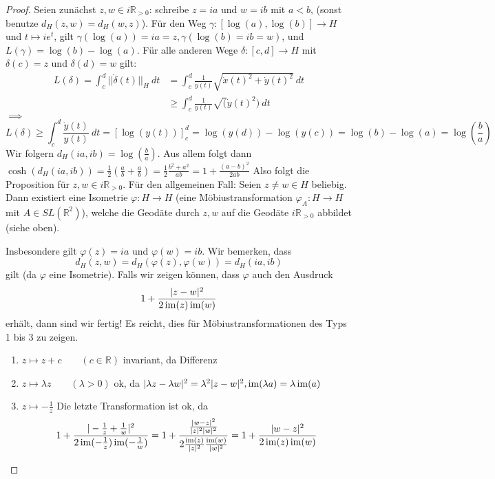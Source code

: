 \documentclass[../main.tex]{subfiles}
\begin{document}
\begin{proof}
    Seien zunächst $z,w \in i\mathbb{R}_{>0}$: schreibe $z=ia$ und $w=ib$ mit $a<b$, (sonst benutze $d_H(z,w)=d_H(w,z)$).
    Für den Weg $\gamma : [\log (a), \log(b)]\to H$ und $ t \mapsto i e^t$, gilt $\gamma(\log(a))=ia=z, \gamma(\log(b)=ib=w)$,
    und $L(\gamma) = \log (b)-\log(a)$. Für alle anderen Wege $\delta : [c,d]\to H$ mit
    $\delta(c)=z$ und $\delta(d)=w$ gilt:
    \begin{align*}
        L(\delta)= \int _c ^d || \dot{\delta}(t)||_H \ dt & = \int_c ^d \frac{1}{y(t)}\sqrt{\dot{x}(t)^2+\dot{y}(t)^2}\ dt \\
        &\ge \int_c ^d \frac{1}{y(t)}\sqrt(\dot{y}(t)^2)\ dt
    \end{align*}$\implies$
    $$L(\delta) \ge \int_c^d \frac{\dot y (t)}{y(t)} \ dt = \left[ \log (y(t)) \right]_c^d = \log(y(d))-\log(y(c))=\log(b)-\log(a)=\log(\frac{b}{a})$$
    Wir folgern $d_H (ia,ib)= \log(\frac{b}{a})$. Aus allem folgt dann $\cosh(d_H(ia,ib))=\frac{1}{2}(\frac{a}{b}+\frac{a}{b})=\frac{1}{2}\frac{b^2+a^2}{ab}=1+ \frac{(a-b)^2}{2ab}$
    Also folgt die Proposition für $z,w \in i\mathbb{R}_{>0}$. Für den allgemeinen Fall:
    Seien $z \not = w\in H$ beliebig. Dann existiert eine Isometrie $\varphi : H \to H$ (eine Möbiustransformation $\varphi _A : H \to H$ mit $A \in SL(\mathbb{R}^2)$),
    welche die Geodäte durch $z,w$ auf die Geodäte $i \mathbb{R}_{>0}$ abbildet (siehe oben).

    Insbesondere gilt $\varphi (z)=ia$ und $\varphi(w)=ib$. Wir bemerken, dass $$d_H(z,w)=d_H(\varphi(z),\varphi(w))=d_H(ia,ib)$$ gilt (da $\varphi$ eine Isometrie).
    Falls wir zeigen können, dass $\varphi$ auch den Ausdruck
    $$1+\frac{|z-w|^2}{2\operatorname{im}(z)\operatorname{im}(w)}$$ erhält, dann sind wir fertig! Es reicht, dies für Möbiustransformationen des Typs 1 bis 3 zu zeigen.
    \begin{enumerate}
        \item $z \mapsto z+ c \qquad(c\in \mathbb{R})$ invariant, da Differenz
        \item $z \mapsto \lambda z \qquad (\lambda > 0)$ ok, da $|\lambda z - \lambda w |^2 = \lambda^2 |z-w|^2, \operatorname{im}(\lambda a)=\lambda \operatorname{im}(a)$ 
        \item $z \mapsto -\frac{1}{z}$
        Die letzte Transformation ist ok, da
        $$1 + \frac{|-\frac{1}{z}+\frac{1}{w}|^2}{2 \operatorname{im}(-\frac{1}{z})\operatorname{im}(-\frac{1}{w})}=1 + \frac{\frac{|w-z|^2}{|z|^2|w|^2}}{2\frac{\operatorname{im}(z)}{|z|^2}\frac{\operatorname{im}(w)}{|w|^2}}=1+\frac{|w-z|^2}{2\operatorname{im}(z)\operatorname{im}(w)}$$
    \end{enumerate}
\end{proof}
\newpage
\end{document}
